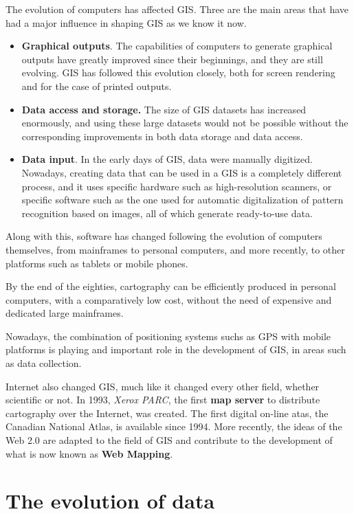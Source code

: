 The evolution of computers has affected GIS. Three are the main areas that have had a major influence in shaping GIS as we know it now.

\begin{itemize}
 \item \textbf{Graphical outputs}. The capabilities of computers to generate graphical outputs have greatly improved since their beginnings, and they are still evolving. GIS has followed this evolution closely, both for screen rendering and for the case of printed outputs.
\item \textbf{Data access and storage.} The size of GIS datasets has increased enormously, and using these large datasets would not be possible without the corresponding improvements in both data storage and data access.
\item \textbf{Data input}. In the early days of GIS, data were manually digitized. Nowadays, creating data that can be used in a GIS is a completely different process, and it uses specific hardware such as high-resolution scanners, or specific software such as the one used for automatic digitalization of pattern recognition based on images, all of which generate ready-to-use data.
\end{itemize}

Along with this, software has changed following the evolution of computers themselves, from mainframes to personal computers, and more recently, to other platforms such as tablets or mobile phones.

By the end of the eighties, cartography can be efficiently produced in personal computers, with a comparatively low cost, without the need of expensive and dedicated large mainframes.

Nowadays, the combination of positioning systems suchs as GPS with mobile platforms is playing and important role in the development of GIS, in areas such as data collection.

Internet also changed GIS, much like it changed every other field, whether scientific or not. In 1993, \emph{Xerox PARC}, the first \textbf{map server} to distribute cartography over the Internet, was created. The first digital on-line atas, the Canadian National Atlas, is available since 1994. More recently, the ideas of the Web 2.0 are adapted to the field of GIS and contribute to the development of what is now known as \textbf{Web Mapping}.

\section{The evolution of data}

